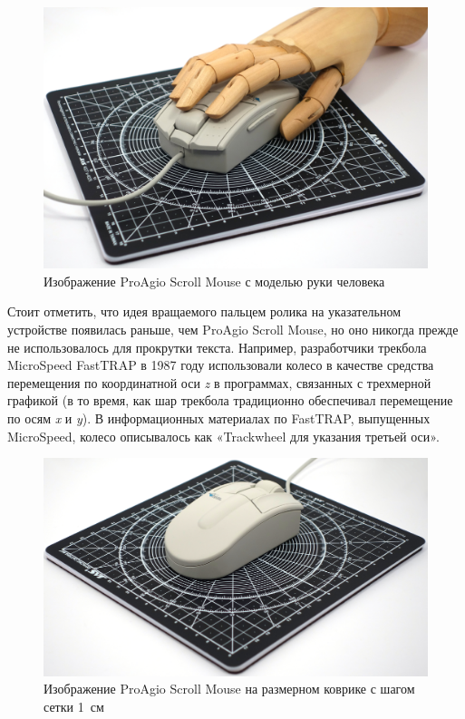 \documentclass[11pt, a4paper]{article}
\begin{document}
\begin{figure}[h]
    \centering
    \includegraphics[scale=0.3]{1995_pro_agio_scroll_mouse/hand_30.jpg}
    \caption{Изображение ProAgio Scroll Mouse с моделью руки человека}
    \label{fig:ScrollHand}
    \end{figure}

Стоит отметить, что идея вращаемого пальцем ролика на указательном устройстве появилась раньше, чем ProAgio Scroll Mouse, но оно никогда прежде не использовалось для прокрутки текста. Например, разработчики трекбола MicroSpeed FastTRAP в 1987 году использовали колесо в качестве средства перемещения по координатной оси \textit{z} в программах, связанных с трехмерной графикой (в то время, как шар трекбола традиционно обеспечивал перемещение по осям \textit{x} и \textit{y}). В информационных материалах по FastTRAP, выпущенных MicroSpeed, колесо описывалось как «Trackwheel для указания третьей оси».

\begin{figure}[h]
    \centering
    \includegraphics[scale=0.37]{1995_pro_agio_scroll_mouse/size_30.jpg}
    \caption{Изображение ProAgio Scroll Mouse на размерном коврике с шагом сетки 1~см}
    \label{fig:ScrollSize}
\end{figure}
\end{document}
